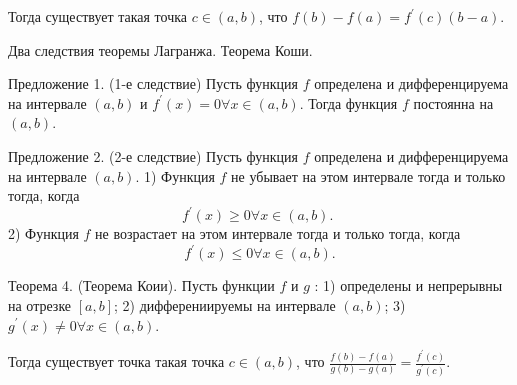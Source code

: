 Тогда существует такая точка $c \in(a, b)$, что $f(b)-f(a)=f^{\prime}(c)(b-a)$.
\newpage
\begin{problem}
Два следствия теоремы Лагранжа. Теорема Коши.\end{problem}
Предложение 1. (1-е следствие) Пусть функция $f$ определена и дифференцируема на интервале $(a, b)$ и $f^{\prime}(x)=0 \forall x \in(a, b)$. Тогда функция $f$ постоянна на $(a, b)$.

Предложение 2. (2-е следствие) Пусть функция $f$ определена и дифференцируема на интервале $(a, b)$.
1) Функция $f$ не убывает на этом интервале тогда и только тогда, когда
$$
f^{\prime}(x) \geq 0 \forall x \in(a, b) \text {. }
$$
2) Функция $f$ не возрастает на этом интервале тогда и только тогда, когда
$$
f^{\prime}(x) \leq 0 \forall x \in(a, b) .
$$

Теорема 4. (Теорема Коии). Пусть функции $f$ и $g$ :
1) определены и непрерывны на отрезке $[a, b]$;
2) дифферениируемы на интервале $(a, b)$;
3) $g^{\prime}(x) \neq 0 \forall x \in(a, b)$.

Тогда существует точка такая точка $c \in(a, b)$, что $\frac{f(b)-f(a)}{g(b)-g(a)}=\frac{f^{\prime}(c)}{g^{\prime}(c)}$.
